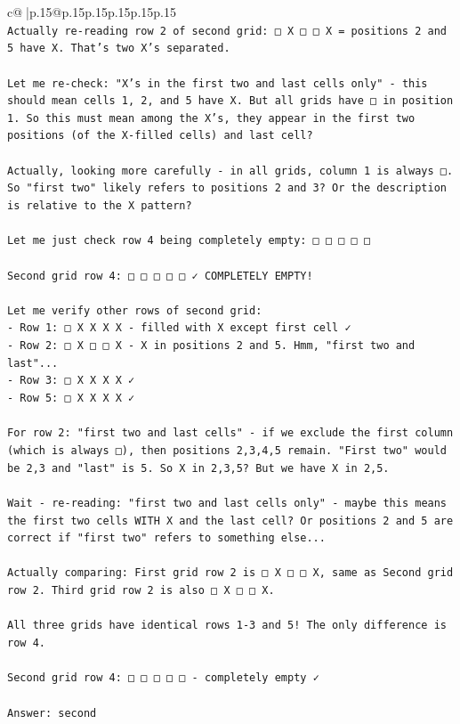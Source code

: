 \documentclass{article}
\begin{document}
{\begin{supertabular}{c@{$\;$}|p{.15\linewidth}@{}p{.15\linewidth}p{.15\linewidth}p{.15\linewidth}p{.15\linewidth}p{.15\linewidth}}
{{{\\ 
\texttt{Actually re{-}reading row 2 of second grid: □ X □ □ X = positions 2 and 5 have X. That's two X's separated.} \\
\\ 
\texttt{Let me re{-}check: "X's in the first two and last cells only" {-} this should mean cells 1, 2, and 5 have X. But all grids have □ in position 1. So this must mean among the X's, they appear in the first two positions (of the X{-}filled cells) and last cell?} \\
\\ 
\texttt{Actually, looking more carefully {-} in all grids, column 1 is always □. So "first two" likely refers to positions 2 and 3? Or the description is relative to the X pattern?} \\
\\ 
\texttt{Let me just check row 4 being completely empty: □ □ □ □ □} \\
\\ 
\texttt{Second grid row 4: □ □ □ □ □ ✓ COMPLETELY EMPTY!} \\
\\ 
\texttt{Let me verify other rows of second grid:} \\
\texttt{{-} Row 1: □ X X X X {-} filled with X except first cell ✓} \\
\texttt{{-} Row 2: □ X □ □ X {-} X in positions 2 and 5. Hmm, "first two and last"...} \\
\texttt{{-} Row 3: □ X X X X ✓} \\
\texttt{{-} Row 5: □ X X X X ✓} \\
\\ 
\texttt{For row 2: "first two and last cells" {-} if we exclude the first column (which is always □), then positions 2,3,4,5 remain. "First two" would be 2,3 and "last" is 5. So X in 2,3,5? But we have X in 2,5.} \\
\\ 
\texttt{Wait {-} re{-}reading: "first two and last cells only" {-} maybe this means the first two cells WITH X and the last cell? Or positions 2 and 5 are correct if "first two" refers to something else...} \\
\\ 
\texttt{Actually comparing: First grid row 2 is □ X □ □ X, same as Second grid row 2. Third grid row 2 is also □ X □ □ X.} \\
\\ 
\texttt{All three grids have identical rows 1{-}3 and 5! The only difference is row 4.} \\
\\ 
\texttt{Second grid row 4: □ □ □ □ □ {-} completely empty ✓} \\
\\ 
\texttt{Answer: second} \\
            }
        }
    }
     \\ \\


\end{supertabular}}
\end{document}
